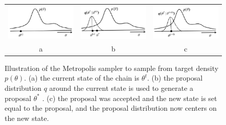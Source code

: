 \begin{figure}[!htb]
\begin{center}
\begin{tabular}{ccc}
 \includegraphics[width=4cm]{./ImaginiLatex/Metropolis1.eps} &
 \includegraphics[width=4cm]{./ImaginiLatex/Metropolis2.eps} &
\includegraphics[width=4cm]{./ImaginiLatex/Metropolis3.eps} \\
a & b & c
\end{tabular}
\end{center}
\caption{Illustration of the Metropolis sampler to sample from target density $p(\theta)$. (a) the current state of the chain is $\theta^t$. (b) the proposal distribution $q$ around the current state is used to generate a proposal $\theta^*$ . 
(c) the proposal was accepted and the new state is set equal to the proposal, and the proposal distribution now centers on the new state.
 }
\label{fig:Metropolis}
\end{figure}

